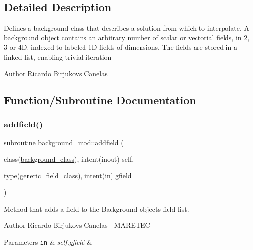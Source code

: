 \subsection{Detailed Description}
Defines a background class that describes a solution from which to interpolate. A background object contains an arbitrary number of scalar or vectorial fields, in 2, 3 or 4D, indexed to labeled 1D fields of dimensions. The fields are stored in a linked list, enabling trivial iteration. 

\begin{DoxyAuthor}{Author}
Ricardo Birjukovs Canelas 
\end{DoxyAuthor}


\subsection{Function/\+Subroutine Documentation}
\mbox{\label{namespacebackground__mod_aa6ddc308698724f00ce1177ded5afc4c}} 
\subsubsection{\texorpdfstring{addfield()}{addfield()}}
{\footnotesize\ttfamily subroutine background\+\_\+mod\+::addfield (\begin{DoxyParamCaption}\item[{class(\mbox{\hyperlink{structbackground__mod_1_1background__class}{background\+\_\+class}}), intent(inout)}]{self,  }\item[{type(generic\+\_\+field\+\_\+class), intent(in)}]{gfield }\end{DoxyParamCaption})\hspace{0.3cm}{\ttfamily [private]}}



Method that adds a field to the Background object\textquotesingle{}s field list. 

\begin{DoxyAuthor}{Author}
Ricardo Birjukovs Canelas -\/ M\+A\+R\+E\+T\+EC 
\end{DoxyAuthor}

\begin{DoxyParams}[1]{Parameters}
\mbox{\tt in}  & {\em self,gfield} & \\
\hline
\end{DoxyParams}


